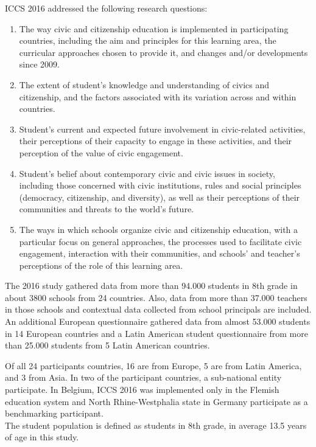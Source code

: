 \documentclass[12pt,a4paper,oneside]{reedthesis}
\providecommand{\tightlist}{%
  \setlength{\itemsep}{0pt}\setlength{\parskip}{0pt}}
\begin{document}
ICCS 2016 addressed the following research questions:
\begin{enumerate}
\def\labelenumi{\arabic{enumi}.}
\tightlist
\item
  The way civic and citizenship education is implemented in participating countries, including the aim and principles for this learning area, the curricular approaches chosen to provide it, and changes and/or developments since 2009.\\
\item
  The extent of student's knowledge and understanding of civics and citizenship, and the factors associated with its variation across and within countries.\\
\item
  Student's current and expected future involvement in civic-related activities, their perceptions of their capacity to engage in these activities, and their perception of the value of civic engagement.\\
\item
  Student's belief about contemporary civic and civic issues in society, including those concerned with civic institutions, rules and social principles (democracy, citizenship, and diversity), as well as their perceptions of their communities and threats to the world's future.\\
\item
  The ways in which schools organize civic and citizenship education, with a particular focus on general approaches, the processes used to facilitate civic engagement, interaction with their communities, and schools' and teacher's perceptions of the role of this learning area.
\end{enumerate}
The 2016 study gathered data from more than 94.000 students in 8th grade in about 3800 schools from 24 countries. Also, data from more than 37.000 teachers in those schools and contextual data collected from school principals are included. An additional European questionnaire gathered data from almost 53.000 students in 14 European countries and a Latin American student questionnaire from more than 25.000 students from 5 Latin American countries.

Of all 24 participants countries, 16 are from Europe, 5 are from Latin America, and 3 from Asia. In two of the participant countries, a sub-national entity participate. In Belgium, ICCS 2016 was implemented only in the Flemish education system and North Rhine-Westphalia state in Germany participate as a benchmarking participant.\\
The student population is defined as students in 8th grade, in average 13.5 years of age in this study.
\end{document}
